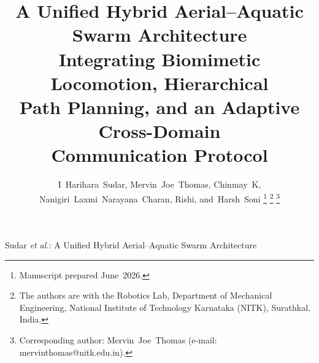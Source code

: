 \documentclass[journal]{IEEEtran}
\begin{document}
\title{A Unified Hybrid Aerial--Aquatic Swarm Architecture\\
Integrating Biomimetic Locomotion, Hierarchical\\
Path Planning, and an Adaptive Cross-Domain\\
Communication Protocol}

\author{I~Harihara~Sudar,
        Mervin~Joe~Thomas,
        Chinmay~K,
        Nanigiri~Laxmi~Narayana~Charan,
        Rishi,
        and~Harsh~Soni%
\thanks{Manuscript prepared June~2026.}%
\thanks{The authors are with the Robotics Lab, Department of Mechanical
Engineering, National Institute of Technology Karnataka (NITK), Surathkal,
India.}%
\thanks{Corresponding author: Mervin~Joe~Thomas
(e-mail: mervinthomas@nitk.edu.in).}}

%
{Sudar \MakeLowercase{\textit{et al.}}: A Unified Hybrid Aerial--Aquatic Swarm Architecture}

\maketitle
\end{document}
